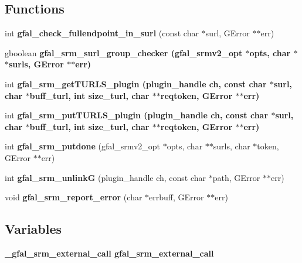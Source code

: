 \subsection*{Functions}
\begin{CompactItemize}
\item 
int \textbf{gfal\_\-check\_\-fullendpoint\_\-in\_\-surl} (const char $\ast$surl, GError $\ast$$\ast$err)\label{gfal__common__srm__internal__layer_8h_d12926fb068b66769f28f2c4fc177bd2}

\item 
gboolean \bf{gfal\_\-srm\_\-surl\_\-group\_\-checker} (gfal\_\-srmv2\_\-opt $\ast$opts, char $\ast$$\ast$surls, GError $\ast$$\ast$err)
\item 
int \bf{gfal\_\-srm\_\-get\-TURLS\_\-plugin} (plugin\_\-handle ch, const char $\ast$surl, char $\ast$buff\_\-turl, int size\_\-turl, char $\ast$$\ast$reqtoken, GError $\ast$$\ast$err)
\item 
int \bf{gfal\_\-srm\_\-put\-TURLS\_\-plugin} (plugin\_\-handle ch, const char $\ast$surl, char $\ast$buff\_\-turl, int size\_\-turl, char $\ast$$\ast$reqtoken, GError $\ast$$\ast$err)
\item 
int \textbf{gfal\_\-srm\_\-putdone} (gfal\_\-srmv2\_\-opt $\ast$opts, char $\ast$$\ast$surls, char $\ast$token, GError $\ast$$\ast$err)\label{gfal__common__srm__internal__layer_8h_0b73cfc8697e7ab0d68dc121047f405f}

\item 
int \textbf{gfal\_\-srm\_\-unlink\-G} (plugin\_\-handle ch, const char $\ast$path, GError $\ast$$\ast$err)\label{gfal__common__srm__internal__layer_8h_46ce9d66bcd7db433a250e0949603622}

\item 
void \textbf{gfal\_\-srm\_\-report\_\-error} (char $\ast$errbuff, GError $\ast$$\ast$err)\label{gfal__common__srm__internal__layer_8h_233010cc6723f86456203d1193fcb648}

\end{CompactItemize}
\subsection*{Variables}
\begin{CompactItemize}
\item 
\bf{\_\-gfal\_\-srm\_\-external\_\-call} \textbf{gfal\_\-srm\_\-external\_\-call}\label{gfal__common__srm__internal__layer_8h_67b12c7342043451fc5ce31b1a3d74fb}

\end{CompactItemize}


